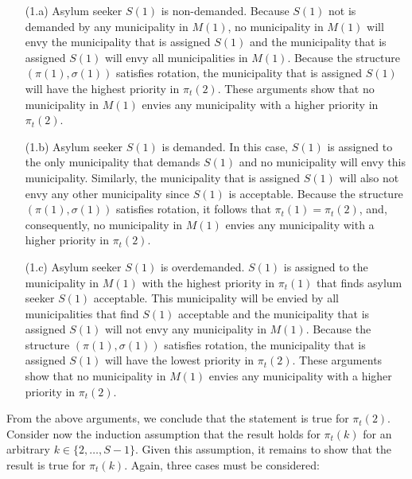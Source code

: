 \documentclass[12pt,fleqn]{article}
\begin{document}
\begin{itemize}

\item[(1.a)] Asylum seeker $S(1)$ is non-demanded. Because $S(1)$ not is demanded by any municipality in $M(1)$, no
municipality in $M(1)$ will envy the municipality that is assigned $S(1)$ and the municipality that is
assigned $S(1)$ will envy all municipalities in $M(1)$. Because the structure $(\pi(1),\sigma(1))$ satisfies
rotation, the municipality that is assigned $S(1)$ will have the highest priority in $\pi_t(2)$. These arguments
show that no municipality in $M(1)$ envies any municipality with a higher priority in $\pi_t(2)$.

\item[(1.b)] Asylum seeker $S(1)$ is demanded. In this case, $S(1)$ is assigned to the only municipality that demands
$S(1)$ and no municipality will envy this municipality. Similarly, the municipality that is assigned $S(1)$ will also not envy any other municipality since $S(1)$ is acceptable. Because the structure $(\pi(1),\sigma(1))$ satisfies rotation,
it follows that $\pi_t(1)=\pi_t(2)$, and, consequently, no municipality in $M(1)$ envies any
municipality with a higher priority in $\pi_t(2)$.

\item[(1.c)] Asylum seeker $S(1)$ is overdemanded. $S(1)$ is assigned to the municipality in $M(1)$ with the highest
priority in $\pi_t(1)$ that finds asylum seeker $S(1)$ acceptable. This municipality will be envied by all
municipalities that find $S(1)$ acceptable and the municipality that is assigned $S(1)$ will not envy any
municipality in $M(1)$. Because the structure $(\pi(1),\sigma(1))$ satisfies rotation, the
municipality that is assigned $S(1)$ will have the lowest priority in $\pi_t(2)$. These arguments show that no
municipality in $M(1)$ envies any municipality with a higher priority in $\pi_t(2)$.

\end{itemize}

\noindent From the above arguments, we conclude that the statement is true for $\pi_t(2)$. Consider now the
induction assumption that the result holds for $\pi_t(k)$ for an arbitrary $k\in \{2,\ldots,S-1\}$. Given this
assumption, it remains to show that the result is true for $\pi_t(k)$. Again, three cases must be considered:
\end{document}
